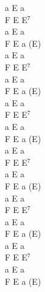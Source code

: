 \documentclass[a5paper, 10pt]{book}
\begin{document}
\begin{minipage}[t]{0.2\textwidth}
  a E a\\
  F E E$^7$\\
  a E a\\
  F E a (E)\\

  a E a\\
  F E E$^7$\\
  a E a\\
  F E a (E)\\

  a E a\\
  F E E$^7$\\
  a E a\\
  F E a (E)\\

  a E a\\
  F E E$^7$\\
  a E a\\
  F E a (E)\\

  a E a\\
  F E E$^7$\\
  a E a\\
  F E a (E)\\

  a E a\\
  F E E$^7$\\
  a E a\\
  F E a (E)\\

\end{minipage}

\newpage
\end{document}
